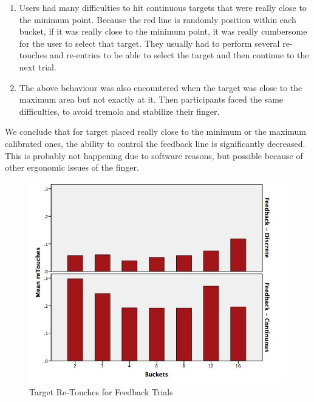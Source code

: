 \begin{enumerate}
     \item Users had many difficulties to hit continuous targets that were really close to the minimum point. Because the red line is randomly position within each bucket, if it was really close to the minimum point, it was really cumbersome for the user to select that target. They usually had to perform several re-touches and re-entries to be able to select the target and then continue to the next trial.  

     \item The above behaviour was also encountered when the target was close to the maximum area but not exactly at it. Then participants faced the same difficulties, to avoid tremolo and stabilize their finger. 
 \end{enumerate} 

 We conclude that for target placed really close to the minimum or the maximum calibrated ones, the ability to control the feedback line is significantly decreased. This is probably not happening due to software reasons, but possible because of other ergonomic issues of the finger. 

\begin{figure}[H]
\centering
\includegraphics[scale=0.4]{figures/meanRetouches}
\caption{Target Re-Touches for Feedback Trials}
\label{fig:meanRetouches}
\end{figure}



